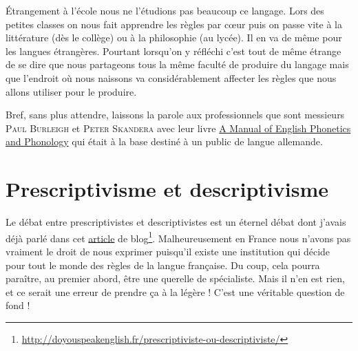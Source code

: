  \'Etrangement à l'école nous ne l'étudions pas beaucoup ce
 langage. Lors des petites classes on nous fait apprendre les règles
 par c{\oe}ur puis on passe vite à la littérature (dès le collège) ou
 à la philosophie (au lycée). Il en va de même pour les langues
 étrangères. Pourtant lorsqu'on y réfléchi c'est tout de même étrange
 de se dire que nous partageons tous la même faculté de produire du
 langage mais que l'endroit où nous naissons va considérablement
 affecter les règles que nous allons utiliser pour le produire.

 Bref, sans plus attendre, laissons la parole aux professionnels que sont
 messieurs \textsc{Paul Burleigh} et \textsc{Peter Skandera} avec leur
 livre \href{https://amzn.to/2HV8BzG}{A Manual of English Phonetics and
  Phonology} qui était à la base destiné à un public de langue allemande.

\newpage
\minitoc
\newpage

\section{Prescriptivisme et descriptivisme}

Le débat entre prescriptivistes et descriptivistes est un éternel
débat dont j'avais déjà parlé dans cet
\href{http://doyouspeakenglish.fr/prescriptiviste-ou-descriptiviste/}{article}
de
blog\footnote{\url{http://doyouspeakenglish.fr/prescriptiviste-ou-descriptiviste/}}. Malheureusement
en France nous n'avons pas vraiment le droit de nous exprimer
puisqu'il existe une institution qui décide pour tout le monde des
règles de la langue française. Du coup, cela pourra paraître, au
premier abord, être une querelle de spécialiste. Mais il n'en est
rien, et ce serait une erreur de prendre ça à la légère ! C'est une
véritable question de fond !

\begin{center}
\begin{mdframed}[style=citestyle, frametitle={Extrait du livre \bs}]
\end{mdframed}  
\end{center}

